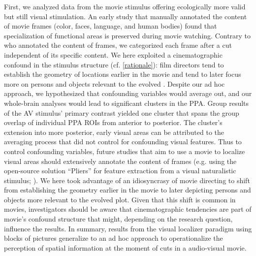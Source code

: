 \documentclass[english]{article}
\begin{document}
First, we analyzed data from the movie stimulus offering ecologically more valid
but still visual stimulation.
%
An early study \citep{bartels2004mapping} that manually annotated the content of
movie frames (color, faces, language, and human bodies) found that
specialization of functional areas is preserved during movie watching.
%
Contrary to \citep{bartels2004mapping} who annotated the content of frames, we
categorized each frame after a cut independent of its specific content.
We here exploited a cinematographic confound in the stimulus structure (cf.
\ref{rationale}):
film directors tend to establish the geometry of locations earlier in the movie
and tend to later focus more on persons and objects relevant to the evolved
\citep{brown2012cinematography, mercado2011filmmakers}.
Despite our ad hoc approach, we hypothesized that confounding variables would
average out, and our whole-brain analyses would lead to significant clusters in
the PPA.
Group results of the AV stimulus' primary contrast yielded one cluster that
spans the group overlap of individual PPA ROIs from anterior to posterior.
The cluster's extension into more posterior, early visual areas can be
attributed to the averaging process that did not control for confounding visual
features.
Thus to control confounding variables, future studies that aim to use a movie to
localize visual areas should extensively annotate the content of frames (e.g.
using the open-source solution ``Pliers'' for feature extraction from a visual
naturalistic stimulus; \citep{mcnamara2017developing}).
We here took advantage of an idiosyncrasy of movie directing to shift from
establishing the geometry earlier in the movie to later depicting persons and
objects more relevant to the evolved plot.
Given that this shift is common in movies, investigators should be aware that
cinematographic tendencies are part of movie's confound structure that might,
depending on the research question, influence the results.
In summary, results from the visual localizer paradigm using blocks of pictures
generalize to an ad hoc approach to operationalize the perception of spatial
information at the moment of cuts in a audio-visual movie.
\end{document}
